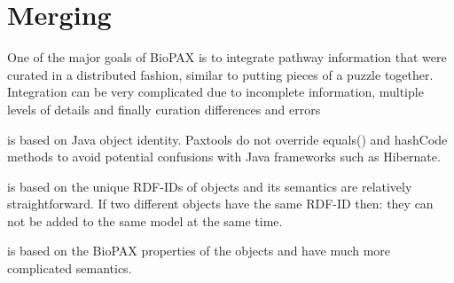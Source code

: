 \documentclass{tufte-book}
\begin{document}
\section{Merging}

One of the major goals of BioPAX is to integrate pathway information that were curated in a distributed fashion, similar to putting pieces of a puzzle together. Integration can be very complicated due  to incomplete information, multiple levels of details and finally curation differences and errors 

 is based on Java object identity. Paxtools do not override equals() and hashCode methods to avoid potential confusions with Java frameworks such as Hibernate.

 is based on the unique RDF-IDs of objects and its semantics are relatively straightforward. If two different objects have the same RDF-ID then: they can not be added to the same model at the same time.

 is based on the BioPAX properties of the objects and have much more complicated semantics. 
\end{document}
